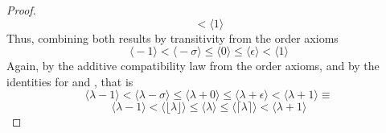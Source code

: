 \documentclass[preview]{standalone}
\begin{document}
\begin{proof}
\begin{equation*}
            <
        \Big \langle 1 \Big \rangle
    \end{equation*}
    Thus, combining both results by transitivity from the order axioms
    \begin{equation*}
        \Big \langle -1 \Big \rangle
            <
        \Big \langle - \sigma \Big \rangle
            \leq
        \Big \langle 0 \Big \rangle
            \leq
        \Big \langle \epsilon \Big \rangle
            <
        \Big \langle 1 \Big \rangle
    \end{equation*}
    Again, by the additive compatibility law from the order axioms, 
    and by the identities for 
    \bm{$\lfloor \lambda \rfloor$} and \bm{$\lceil \lambda \rceil$},
    that is
    \begin{equation*}
        \Big \langle \lambda - 1 \Big \rangle
            <
        \Big \langle \lambda - \sigma \Big \rangle
            \leq
        \Big \langle \lambda + 0 \Big \rangle
            \leq
        \Big \langle \lambda + \epsilon \Big \rangle
            <
        \Big \langle \lambda + 1 \Big \rangle
            \equiv
    \end{equation*}
    \begin{equation*}
        \Big \langle \lambda - 1 \Big \rangle
            <
        \Big \langle \lfloor \lambda \rfloor \Big \rangle
            \leq
        \Big \langle \lambda \Big \rangle
            \leq
        \Big \langle \lceil \lambda \rceil \Big \rangle
            <
        \Big \langle \lambda + 1 \Big \rangle
    \end{equation*}
\color{lightgray} \end{proof}
\end{document}
